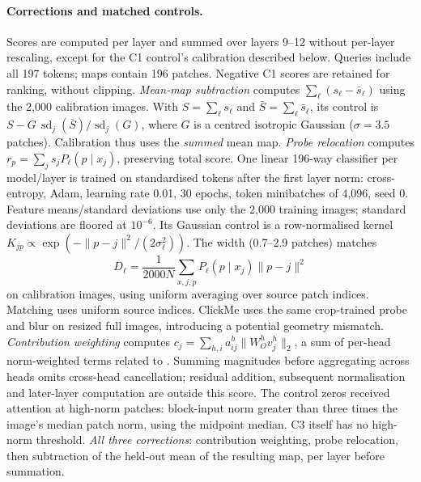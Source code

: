 \paragraph{Corrections and matched controls.} Scores are computed per layer and summed over layers 9--12 without per-layer rescaling, except for the C1 control's calibration described below. Queries include all 197 tokens; maps contain 196 patches. Negative C1 scores are retained for ranking, without clipping.
\emph{Mean-map subtraction} computes $\sum_\ell(s_\ell-\bar s_\ell)$ using the 2,000 calibration images. With $S=\sum_\ell s_\ell$ and $\bar S=\sum_\ell\bar s_\ell$, its control is $S-G\,\operatorname{sd}_j(\bar S)/\operatorname{sd}_j(G)$, where $G$ is a centred isotropic Gaussian ($\sigma=3.5$ patches). Calibration thus uses the \emph{summed} mean map.
\emph{Probe relocation} computes $r_p=\sum_j s_jP_\ell(p\mid x_j)$, preserving total score. One linear 196-way classifier per model/layer is trained on standardised tokens after the first layer norm: cross-entropy, Adam, learning rate 0.01, 30 epochs, token minibatches of 4,096, seed 0. Feature means/standard deviations use only the 2,000 training images; standard deviations are floored at $10^{-6}$. Its Gaussian control is a row-normalised kernel $K_{jp}\propto\exp(-\lVert p-j\rVert^2/(2\sigma_\ell^2))$. The width (0.7--2.9 patches) matches
\[
D_\ell=\frac{1}{2000N}\sum_{x,j,p}P_\ell(p\mid x_j)\lVert p-j\rVert^2
\]
on calibration images, using uniform averaging over source patch indices. Matching uses uniform source indices. ClickMe uses the same crop-trained probe and blur on resized full images, introducing a potential geometry mismatch.
\emph{Contribution weighting} computes $c_j=\sum_{h,i}a_{ij}^h\lVert W_O^hv_j^h\rVert_2$, a sum of per-head norm-weighted terms related to \citet{kobayashi2020}. Summing magnitudes before aggregating across heads omits cross-head cancellation; residual addition, subsequent normalisation and later-layer computation are outside this score. The control zeros received attention at high-norm patches: block-input norm greater than three times the image's median patch norm, using the midpoint median. C3 itself has no high-norm threshold.
\emph{All three corrections}: contribution weighting, probe relocation, then subtraction of the held-out mean of the resulting map, per layer before summation.

